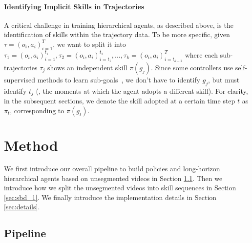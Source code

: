 \paragraph{Identifying Implicit Skills in Trajectories}
A critical challenge in training hierarchical agents, as described above, is the identification of skills within the trajectory data. To be more specific, given $\tau=(o_i, a_i)_{i=1}^T$, we want to split it into $\tau_1=(o_i, a_i)_{i=1}^{t_1}, \tau_2=(o_i, a_i)_{i=t_1}^{t_2}, \ldots, \tau_k=(o_i, a_i)_{i=t_{k-1}}^{T}$ where each sub-trajectories $\tau_j$ shows an independent skill $\pi(g_j)$. Since some controllers use self-supervised methods to learn sub-goals~\citep{steve1,groot1}, we don't have to identify $g_j$, but must identify $t_j$ (\ie, the moments at which the agent adopts a different skill). 
For clarity, in the subsequent sections, we denote the skill adopted at a certain time step $t$ as $\pi_t$, corresponding to $\pi(g_t)$.

\section{Method}
\label{sec:method}

We first introduce our overall pipeline to build policies and long-horizon hierarchical agents based on unsegmented videos in Section \ref{sec:pipeline}. Then we introduce how we split the unsegmented videos into skill sequences in Section \ref{sec:sbd_1}. We finally introduce the implementation details in Section \ref{sec:details}.


\subsection{Pipeline}\label{sec:pipeline}

